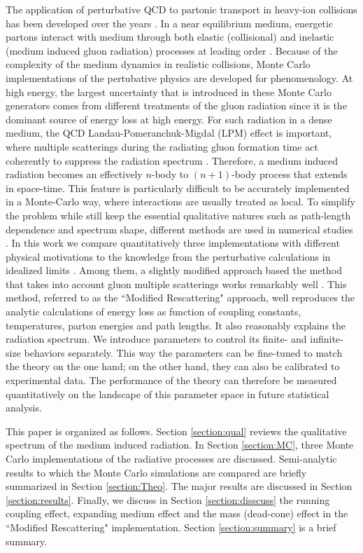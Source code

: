 \documentclass[aps, prc, reprint, amsmath, groupedaddress, nofootinbib]{revtex4-1}
\begin{document}
The application of perturbative QCD to partonic transport in heavy-ion collisions has been developed over the years \cite{Arnold:2002zm}.
In a near equilibrium medium, energetic partons interact with medium through both elastic (collisional) and inelastic (medium induced gluon radiation) processes at leading order \cite{Ghiglieri:2015ala}.
Because of the complexity of the medium dynamics in realistic collisions, Monte Carlo implementations of the pertubative physics are developed for phenomenology.
At high energy, the largest uncertainty that is introduced in these Monte Carlo generators comes from different treatments of the gluon radiation since it is the dominant source of energy loss at high energy.
For such radiation in a dense medium, the QCD Landau-Pomeranchuk-Migdal (LPM) effect is important, where multiple scatterings during the radiating gluon formation time act coherently to suppress the radiation spectrum \cite{PhysRev.103.1811,Wang:1994fx,Zakharov:1996fv,Baier:1996kr}.
Therefore, a medium induced radiation becomes an effectively $n$-body to $(n+1)$-body process that extends in space-time.
This feature is particularly difficult to be accurately implemented in a Monte-Carlo way, where interactions are usually treated as local.
To simplify the problem while still keep the essential qualitative natures such as path-length dependence and spectrum shape, different methods are used in numerical studies \cite{Djordjevic:2008iz,Cao:2013ita,ColemanSmith:2012vr,Xu:2004mz, Zapp:2011ya, Gossiaux:2012cv,Park:thesis}.
In this work we compare quantitatively three implementations with different physical motivations to the knowledge from the perturbative calculations in idealized limits \cite{Arnold:2008zu,Arnold:2009mr}.
Among them, a slightly modified approach based the method that takes into account gluon multiple scatterings works remarkably well \cite{Zapp:2011ya}.
This method, referred to as the ``Modified Rescattering" approach, well reproduces the analytic calculations of energy loss as function of coupling constants, temperatures, parton energies and path lengths.
It also reasonably explains the radiation spectrum.
We introduce parameters to control its finite- and infinite-size behaviors separately.
This way the parameters can be fine-tuned to match the theory on the one hand; on the other hand, they can also be calibrated to experimental data.
The performance of the theory can therefore be measured quantitatively on the landscape of this parameter space in future statistical analysis.

This paper is organized as follows. Section \ref{section:qual} reviews the qualitative spectrum of the medium induced radiation.
In Section \ref{section:MC}, three Monte Carlo implementations of the radiative processes are discussed. 
Semi-analytic results to which the Monte Carlo simulations are compared are briefly summarized in Section \ref{section:Theo}.
The major results are discussed in Section \ref{section:results}.
Finally, we discuss in Section \ref{section:disscuss} the running coupling effect, expanding medium effect and the mass (dead-cone) effect in the ``Modified Rescattering" implementation. Section \ref{section:summary} is a brief summary.
\end{document}

